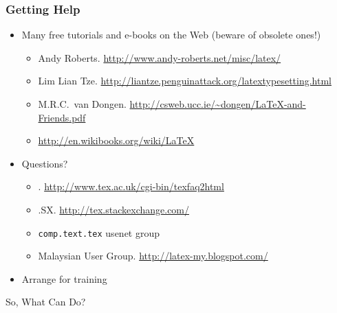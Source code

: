 \begin{frame}[label=help]
\frametitle{Getting Help}
\begin{itemize}
\item<+-> Many free tutorials and e-books on the Web (beware of obsolete ones!)
\begin{itemize}
\item {}\; Andy Roberts. \url{http://www.andy-roberts.net/misc/latex/}
\item {}\; Lim Lian Tze. \url{http://liantze.penguinattack.org/latextypesetting.html}
\item {}\; M.R.C.\ van Dongen. \url{http://csweb.ucc.ie/~dongen/LaTeX-and-Friends.pdf}
\item {}\; \url{http://en.wikibooks.org/wiki/LaTeX}
\end{itemize}

\item<+-> Questions?
\begin{itemize}
\item {} .\;  \url{http://www.tex.ac.uk/cgi-bin/texfaq2html}
\item {}.SX.\; \url{http://tex.stackexchange.com/}
\item \texttt{comp.text.tex} usenet group
\item Malaysian  User Group.\; \url{http://latex-my.blogspot.com/}
\end{itemize}

\item<3-> Arrange for training
\end{itemize}
\end{frame}


\begin{frame}
\centering\Huge
So, What Can  Do?
\par
\end{frame}